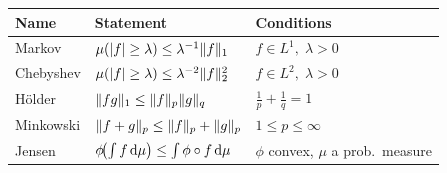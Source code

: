 \begin{center}
\renewcommand{\arraystretch}{1.4}
\begin{tabular}{@{} l l l @{}}
    \toprule
    \textsf{Name} & \textsf{Statement} & \textsf{Conditions} \\
    \midrule
    Markov     & $\mu(\lvert f\rvert\geq\lambda)\leq \lambda^{-1}\lVert f\rVert_1$
               & $f\in L^1,\;\lambda>0$ \\
    Chebyshev  & $\mu(\lvert f\rvert\geq\lambda)\leq \lambda^{-2}\lVert f\rVert_2^2$
               & $f\in L^2,\;\lambda>0$ \\
    Hölder     & $\lVert fg\rVert_1 \leq \lVert f\rVert_p\lVert g\rVert_q$
               & $\tfrac1p+\tfrac1q=1$ \\
    Minkowski  & $\lVert f+g\rVert_p \leq \lVert f\rVert_p+\lVert g\rVert_p$
               & $1\leq p\leq\infty$ \\
    Jensen     & $\phi\!\bigl(\int f\,\mathrm{d}\mu\bigr)\leq\int\phi\circ f\,\mathrm{d}\mu$
               & $\phi$ convex, $\mu$ a prob.\ measure \\
    \bottomrule
\end{tabular}
\end{center}
